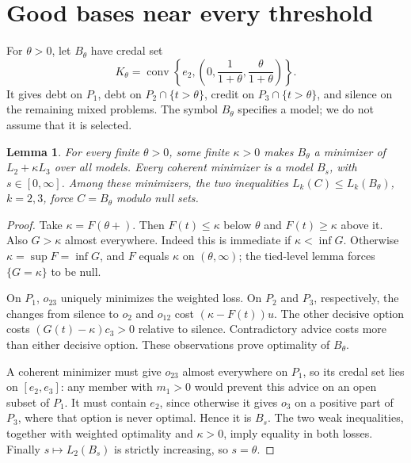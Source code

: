 \documentclass[11pt]{article}
\newtheorem{lemma}[theorem]{Lemma}
\theoremstyle{remark}\newtheorem{remark}[theorem]{Remark}
\begin{document}
\section{Good bases near every threshold}

For $\theta>0$, let $B_\theta$ have credal set
\[
 K_\theta=\operatorname{conv}\left\{e_2,
       \left(0,\frac1{1+\theta},\frac\theta{1+\theta}\right)\right\}.
\]
It gives debt on $P_1$, debt on $P_2\cap\{t>\theta\}$, credit on
$P_3\cap\{t>\theta\}$, and silence on the remaining mixed problems.
The symbol $B_\theta$ specifies a model; we do not assume that it is selected.

\begin{lemma}\label{lem:bayes}
For every finite $\theta>0$, some finite $\kappa>0$ makes $B_\theta$
a minimizer of $L_2+\kappa L_3$ over all models. Every coherent minimizer
is a model $B_s$, with $s\in[0,\infty]$. Among these minimizers,
the two inequalities $L_k(C)\le L_k(B_\theta)$, $k=2,3$, force
$C=B_\theta$ modulo null sets.
\end{lemma}
\begin{proof}
Take $\kappa=F(\theta+)$. Then $F(t)\le\kappa$ below $\theta$ and
$F(t)\ge\kappa$ above it. Also $G>\kappa$ almost everywhere. Indeed this is
immediate if $\kappa<\inf G$. Otherwise $\kappa=\sup F=\inf G$, and $F$
equals $\kappa$ on $(\theta,\infty)$; the tied-level lemma forces
$\{G=\kappa\}$ to be null.

On $P_1$, $o_{23}$ uniquely minimizes the weighted loss. On $P_2$ and
$P_3$, respectively, the changes from silence to $o_2$ and $o_{12}$ cost
$(\kappa-F(t))u$. The other decisive option costs
$(G(t)-\kappa)c_3>0$ relative to silence. Contradictory advice costs more
than either decisive option. These observations prove optimality of
$B_\theta$.

A coherent minimizer must give $o_{23}$ almost everywhere on $P_1$, so its
credal set lies on $[e_2,e_3]$: any member with $m_1>0$ would prevent this
advice on an open subset of $P_1$. It must contain $e_2$, since otherwise
it gives $o_3$ on a positive part of $P_3$, where that option is never
optimal. Hence it is $B_s$. The two weak inequalities, together with
weighted optimality and $\kappa>0$, imply equality in both losses.
Finally $s\mapsto L_2(B_s)$ is strictly increasing, so $s=\theta$.
\end{proof}
\end{document}

